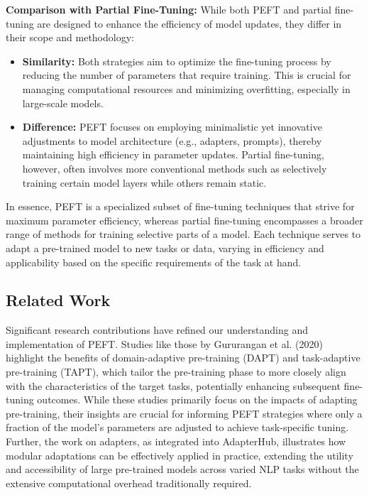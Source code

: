 \documentclass[12pt]{article}
\begin{document}
\textbf{Comparison with Partial Fine-Tuning:}
While both PEFT and partial fine-tuning are designed to enhance the efficiency of model updates, they differ in their scope and methodology:
\begin{itemize}
    \item \textbf{Similarity:} Both strategies aim to optimize the fine-tuning process by reducing the number of parameters that require training. This is crucial for managing computational resources and minimizing overfitting, especially in large-scale models.
    
    \item \textbf{Difference:} PEFT focuses on employing minimalistic yet innovative adjustments to model architecture (e.g., adapters, prompts), thereby maintaining high efficiency in parameter updates. Partial fine-tuning, however, often involves more conventional methods such as selectively training certain model layers while others remain static.
\end{itemize}

In essence, PEFT is a specialized subset of fine-tuning techniques that strive for maximum parameter efficiency, whereas partial fine-tuning encompasses a broader range of methods for training selective parts of a model. Each technique serves to adapt a pre-trained model to new tasks or data, varying in efficiency and applicability based on the specific requirements of the task at hand.

\subsection{Related Work}
Significant research contributions have refined our understanding and implementation of PEFT. Studies like those by Gururangan et al. (2020) highlight the benefits of domain-adaptive pre-training (DAPT) and task-adaptive pre-training (TAPT), which tailor the pre-training phase to more closely align with the characteristics of the target tasks, potentially enhancing subsequent fine-tuning outcomes. While these studies primarily focus on the impacts of adapting pre-training, their insights are crucial for informing PEFT strategies where only a fraction of the model's parameters are adjusted to achieve task-specific tuning. Further, the work on adapters, as integrated into AdapterHub, illustrates how modular adaptations can be effectively applied in practice, extending the utility and accessibility of large pre-trained models across varied NLP tasks without the extensive computational overhead traditionally required.
\end{document}
